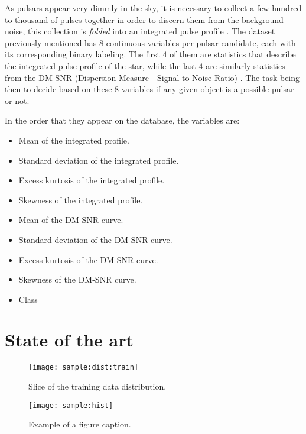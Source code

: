 \documentclass[conference]{IEEEtran}
\begin{document}
As pulsars appear very dimmly in the sky, it is necessary to collect a few hundred
to thousand of pulses together in order to discern them from the background noise,
this collection is \textit{folded} into an integrated pulse profile
\cite{pulsar:importance:kramer}. The dataset previously mentioned
has 8 continuous variables per pulsar candidate, each with its corresponding
binary labeling. The first $4$ of them are statistics that describe the
integrated pulse profile of the star, while the last $4$ are similarly
statistics from the DM-SNR (Dispersion Measure - Signal to Noise Ratio)
\cite{pulsar:dataset:explanation:lyon}. The task being then to decide based
on these 8 variables if any given object is a possible pulsar or not.

In the order that they appear on the database, the variables are:

\begin{itemize}
    \item Mean of the integrated profile.
    \item Standard deviation of the integrated profile.
    \item Excess kurtosis of the integrated profile.
    \item Skewness of the integrated profile.
    \item Mean of the DM-SNR curve.
    \item Standard deviation of the DM-SNR curve.
    \item Excess kurtosis of the DM-SNR curve.
    \item Skewness of the DM-SNR curve.
    \item Class 
\end{itemize}


\section{State of the art\label{sec:state_of_art}}

\todo{}

\begin{figure}[h]
    \texttt{[image: sample:dist:train]}
    \caption{Slice of the training data distribution. \label{fig:sample:dist:train}}
\end{figure}

\begin{figure*}[h]
    \texttt{[image: sample:hist]}
    \caption{Example of a figure caption. \label{fig:sample:hist}}
\end{figure*}
\end{document}
